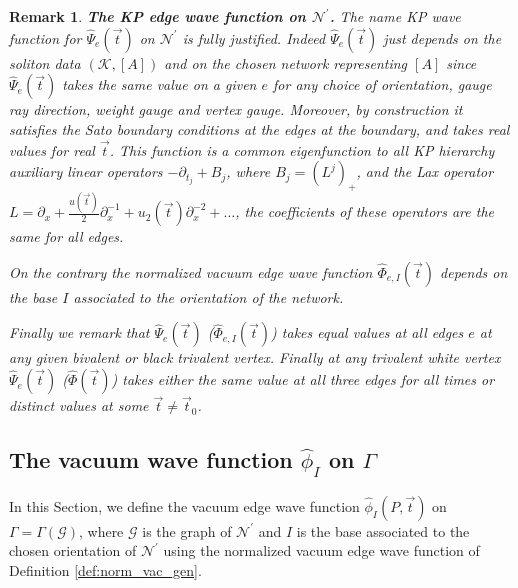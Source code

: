 \documentclass[11pt]{amsart}
\theoremstyle{plain}
\numberwithin{equation}{section}
\newtheorem{remark}{Remark}[subsection]
\begin{document}
\begin{remark}\label{rem:indep}\textbf{The KP edge wave function on $\mathcal N^{\prime}$.} 
The name KP wave function for $\hat \Psi_e (\vec t)$ on $\mathcal N^{\prime}$ is fully justified. Indeed $\hat \Psi_e (\vec t)$ just depends on the soliton data $(\mathcal K, [A])$ and on the chosen network representing $[A]$ since $\hat \Psi_e (\vec t)$ takes the same value on a given $e$ for any choice of orientation, gauge ray direction, weight gauge and vertex gauge. Moreover, by construction it satisfies the Sato boundary conditions at the edges at the boundary, and takes real values for real $\vec t$. This function is a common eigenfunction to all KP hierarchy auxiliary linear operators $-\partial_{t_j} + B_j$, where $B_j =(L^j)_+$, and the Lax operator $L=\partial_x+\frac{u(\vec t)}{2}\partial_x^{-1}+ u_2(\vec t)\partial_x^{-2}+\ldots$, the coefficients of these operators are the same for all edges.

On the contrary the normalized vacuum edge wave function $\hat \Phi_{e,I} (\vec t)$ depends on the base $I$ associated to the orientation of the network.

Finally we remark that $\hat \Psi_e (\vec t)$ ($\hat \Phi_{e,I} (\vec t)$) takes equal values at all edges $e$ at any given bivalent or black trivalent vertex. Finally at any trivalent white vertex $\hat \Psi_e (\vec t)$ ($\hat \Phi(\vec t)$) takes either the same value at all three edges for all times or distinct values at some $\vec t\not= \vec t_0$. 
\end{remark}


\subsection{The vacuum wave function $\hat \phi_I$ on $\Gamma$}\label{sec:vac_KP_gen}

In this Section, we define the vacuum edge wave function $\hat \phi_I (P, \vec t)$ on $\Gamma=\Gamma (\mathcal G)$, where $\mathcal G$ is the graph of $\mathcal N^{\prime}$ and $I$ is the base associated to the chosen orientation of $\mathcal N^{\prime}$ using the normalized vacuum edge wave function of Definition \ref{def:norm_vac_gen}. 
\end{document}
